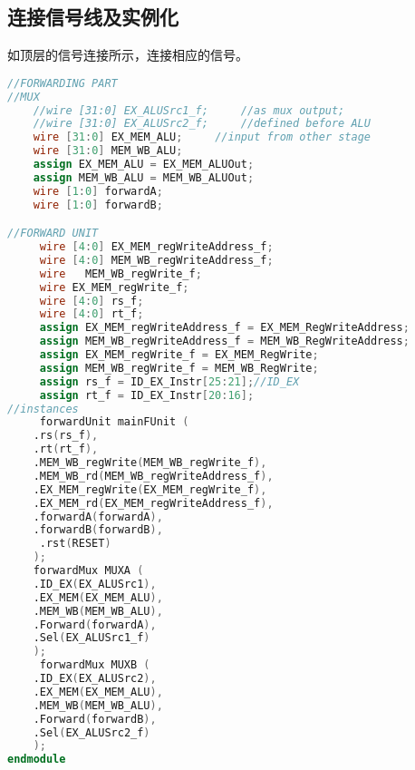 \documentclass[a4paper]{article}
\begin{document}
    \subsection{连接信号线及实例化}
    如顶层的信号连接所示，连接相应的信号。
    \begin{lstlisting}[language={Verilog},title={forwardMUX.v}]
//FORWARDING PART
//MUX
	//wire [31:0] EX_ALUSrc1_f;		//as mux output;
	//wire [31:0] EX_ALUSrc2_f;		//defined before ALU
	wire [31:0] EX_MEM_ALU;		//input from other stage
	wire [31:0] MEM_WB_ALU;
	assign EX_MEM_ALU = EX_MEM_ALUOut;
	assign MEM_WB_ALU = MEM_WB_ALUOut;
	wire [1:0] forwardA;
	wire [1:0] forwardB;

//FORWARD UNIT	
	 wire [4:0] EX_MEM_regWriteAddress_f;
	 wire [4:0] MEM_WB_regWriteAddress_f;
	 wire	MEM_WB_regWrite_f;
	 wire EX_MEM_regWrite_f;
	 wire [4:0] rs_f;
	 wire [4:0] rt_f;
	 assign EX_MEM_regWriteAddress_f = EX_MEM_RegWriteAddress;
	 assign MEM_WB_regWriteAddress_f = MEM_WB_RegWriteAddress;
	 assign EX_MEM_regWrite_f = EX_MEM_RegWrite;
	 assign MEM_WB_regWrite_f = MEM_WB_RegWrite;
	 assign rs_f = ID_EX_Instr[25:21];//ID_EX
	 assign rt_f = ID_EX_Instr[20:16];
//instances	
	 forwardUnit mainFUnit (
    .rs(rs_f),
    .rt(rt_f),
    .MEM_WB_regWrite(MEM_WB_regWrite_f),
    .MEM_WB_rd(MEM_WB_regWriteAddress_f),
    .EX_MEM_regWrite(EX_MEM_regWrite_f),
    .EX_MEM_rd(EX_MEM_regWriteAddress_f),
    .forwardA(forwardA),
    .forwardB(forwardB),
	 .rst(RESET)
    );
	forwardMux MUXA (
    .ID_EX(EX_ALUSrc1),
    .EX_MEM(EX_MEM_ALU),
    .MEM_WB(MEM_WB_ALU),
    .Forward(forwardA),
    .Sel(EX_ALUSrc1_f)
    );
	 forwardMux MUXB (
    .ID_EX(EX_ALUSrc2),
    .EX_MEM(EX_MEM_ALU),
    .MEM_WB(MEM_WB_ALU),
    .Forward(forwardB),
    .Sel(EX_ALUSrc2_f)
    );
endmodule  \end{lstlisting}
\end{document}
